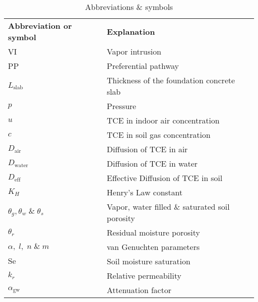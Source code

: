 \documentclass[journal=esthag,manuscript=article]{achemso}
\begin{document}
\begin{table}[htb!]
  \caption{Abbreviations \& symbols}
  \begin{tabular}{l l}
  \toprule
  \textbf{Abbreviation or symbol}     & \textbf{Explanation} \\
  VI                                  & Vapor intrusion \\
  PP                                  & Preferential pathway \\
  $L_\mathrm{slab}$                   & Thickness of the foundation concrete slab \\
  $p$                                 & Pressure \\
  $u$                                 & TCE in indoor air concentration \\
  $c$                                 & TCE in soil gas concentration \\
  $D_\mathrm{air}$                    & Diffusion of TCE in air \\
  $D_\mathrm{water}$                  & Diffusion of TCE in water \\
  $D_\mathrm{eff}$                    & Effective Diffusion of TCE in soil \\
  $K_H$                               & Henry's Law constant \\
  $\theta_g, \theta_w\;\&\;\theta_s$  & Vapor, water filled \& saturated soil porosity \\
  $\theta_r$                          & Residual moisture porosity \\
  $\alpha,\; l,\; n\;\&\; m$          & van Genuchten parameters \\
  $\mathrm{Se}$                       & Soil moisture saturation \\
  $k_r$                               & Relative permeability \\
  $\alpha_\mathrm{gw}$                & Attenuation factor \\
  \bottomrule
  \end{tabular}
\end{table}


\end{document}
